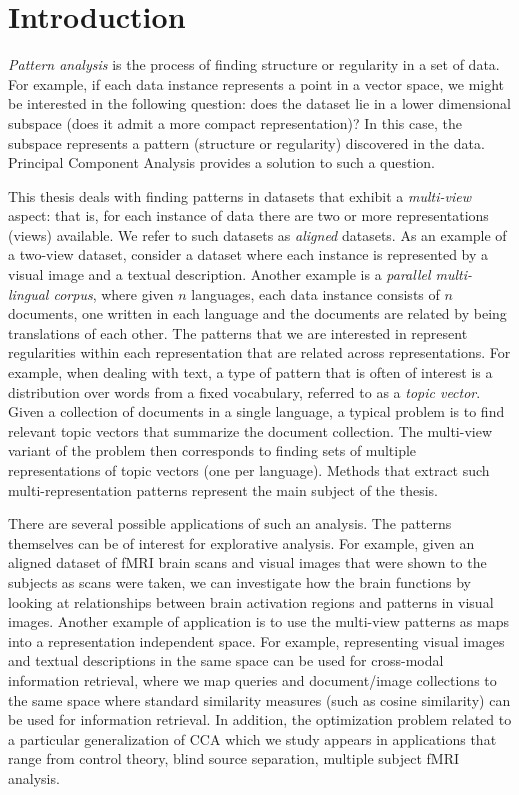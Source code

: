 %
\chapter{Introduction}


\emph{Pattern analysis} is the process of finding structure or regularity in a set of data. For example,
if each data instance represents a point in a vector space, we might be interested in the following question: does the dataset lie
in a lower dimensional subspace (does it admit a more compact representation)? In this case, the subspace represents a pattern (structure or regularity)
discovered in the data. Principal Component Analysis provides a solution to such a question.

 This thesis deals with finding patterns in datasets that exhibit a \emph{multi-view} aspect: that is, for
each instance of data there are two or more representations (views) available. We refer to such datasets as
\emph{aligned} datasets. As an example of a two-view dataset, consider a dataset where each instance is represented by a visual image and
a textual description. Another example is a \emph{parallel multi-lingual corpus},
where given $n$ languages, each data instance consists of $n$ documents, one written in each language and the documents are related by being
translations of each other. The patterns that we are interested in represent regularities within each representation
 that are related across representations. For example, when dealing with text, a type of pattern that is often of interest
 is a distribution over words from a fixed vocabulary, referred to as a \emph{topic vector}. Given a collection of documents
 in a single language, a typical problem is to find relevant topic vectors that summarize the document collection. The multi-view
 variant of the problem then corresponds to finding sets of multiple representations of topic vectors (one per language).
Methods that extract such multi-representation patterns represent the main subject of the thesis.

There are several possible applications of such an analysis. The patterns themselves can be of interest 
for explorative analysis. For example, given an aligned dataset of fMRI brain scans and visual images that were
shown to the subjects as scans were taken, we can investigate how the brain functions by looking at
relationships between brain activation regions and patterns in visual images.
 Another example of application is to use the multi-view patterns as maps into a
representation independent space. For example, representing visual images and textual descriptions in the same
space can be used for cross-modal information retrieval, where we map queries and document/image collections
to the same space where standard similarity measures (such as cosine similarity) can be used for information
retrieval. In addition, the optimization problem related to a particular generalization of CCA which we study
appears in applications that range from control theory, blind source separation, multiple subject fMRI analysis.

